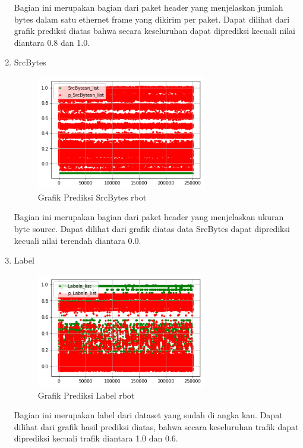 \documentclass[./skripsi.tex]{subfiles}
\begin{document}
\begin{enumerate}
    \par Bagian ini merupakan bagian dari paket header yang menjelaskan jumlah bytes dalam satu ethernet frame yang dikirim per paket. Dapat dilihat dari grafik prediksi diatas bahwa secara keseluruhan dapat diprediksi kecuali nilai diantara 0.8 dan 1.0.
    
    \item SrcBytes
    \begin{figure}%
        \centering
        \includegraphics[width=0.7\textwidth]{public/assets/img/lstmm_rbot_pred9.png}
        \caption{Grafik Prediksi SrcBytes rbot}
        \label{fig:lstmm_rbot_pred9}
    \end{figure}
    
    \par Bagian ini merupakan bagian dari paket header yang menjelaskan ukuran byte source. Dapat dilihat dari grafik diatas data SrcBytes dapat diprediksi kecuali nilai terendah diantara 0.0.
    \item Label
    \begin{figure}%
        \centering
        \includegraphics[width=0.7\textwidth]{public/assets/img/lstmm_rbot_pred10.png}
        \caption{Grafik Prediksi Label rbot}
        \label{fig:lstmm_rbot_pred10}
    \end{figure}
    
    \par Bagian ini merupakan label dari dataset yang sudah di angka kan. Dapat dilihat dari grafik hasil prediksi diatas, bahwa secara keseluruhan trafik dapat diprediksi kecuali trafik diantara 1.0 dan 0.6.
\end{enumerate}
\end{document}
